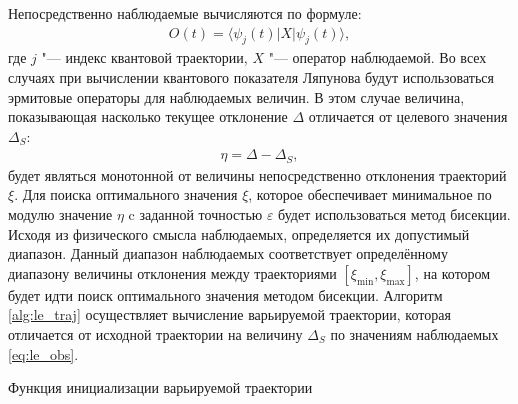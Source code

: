 Непосредственно наблюдаемые вычисляются по формуле:
\begin{equation}
	\label{eq:le_obs}
	\begin{gathered}
		O(t) =  \langle \psi_j(t)| X | \psi_j(t) \rangle,
	\end{gathered}
\end{equation}
где $j$ "--- индекс квантовой траектории, $X$ "--- оператор наблюдаемой. Во всех случаях при вычислении квантового показателя Ляпунова будут использоваться эрмитовые операторы для наблюдаемых величин. В этом случае величина, показывающая насколько текущее отклонение $\Delta$ отличается от целевого значения $\Delta_S$:
\begin{equation}
	\label{eq:le_eta}
	\begin{gathered}
		\eta =  \Delta - \Delta_S,
	\end{gathered}
\end{equation}
будет являться монотонной от величины непосредственно отклонения траекторий \(\xi\).
Для поиска оптимального значения \(\xi\), которое обеспечивает минимальное по модулю значение $\eta$ c заданной точностью $\varepsilon$ будет использоваться метод бисекции. 
Исходя из физического смысла наблюдаемых, определяется их допустимый диапазон. 
Данный диапазон наблюдаемых соответствует определённому диапазону величины отклонения между траекториями $\left[\xi_{\text{min}}, \xi_{\text{max}}\right]$, на котором будет идти поиск оптимального значения методом бисекции.
Алгоритм \ref{alg:le_traj} осуществляет вычисление варьируемой траектории, которая отличается от исходной траектории на величину $\Delta_S$ по значениям наблюдаемых \cref{eq:le_obs}.

\IncMargin{1em}
\begin{algorithm}
	\SetAlgoLined
	\caption{Функция инициализации варьируемой траектории}
	\label{alg:le_traj}
\end{algorithm}
\DecMargin{1em}


